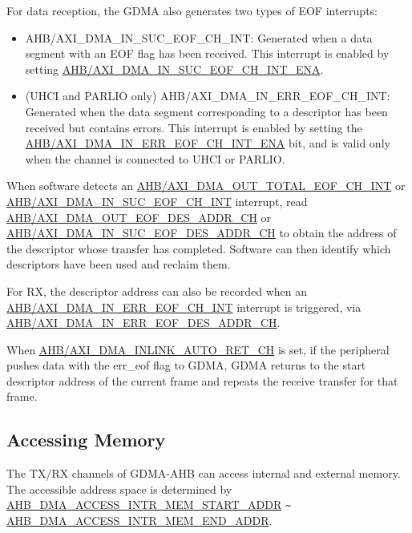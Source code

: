 \documentclass[main\_\_EN.tex]{subfiles}
\begin{document}
For data reception, the GDMA also generates two types of EOF interrupts:
\begin{itemize}
    \item AHB/AXI\_DMA\_IN\_SUC\_EOF\_CH\_INT: Generated when a data segment with an EOF flag has been received. This interrupt is enabled by setting \hyperref[fielddesc:AHBDMAINSUCEOFCHNINTENA]{AHB/AXI\_DMA\_IN\_SUC\_EOF\_CH\_INT\_ENA}.
    \item (UHCI and PARLIO only) AHB/AXI\_DMA\_IN\_ERR\_EOF\_CH\_INT: Generated when the data segment corresponding to a descriptor has been received but contains errors. This interrupt is enabled by setting the \hyperref[fielddesc:AHBDMAINERREOFCHNINTENA]{AHB/AXI\_DMA\_IN\_ERR\_EOF\_CH\_INT\_ENA} bit, and is valid only when the channel is connected to UHCI or PARLIO.
\end{itemize}

When software detects an \hyperref[int:GDMAOUTTOTALEOFINT]{AHB/AXI\_DMA\_OUT\_TOTAL\_EOF\_CH\_INT} or \hyperref[int:GDMAINSUCEOFINT]{AHB/AXI\_DMA\_IN\_SUC\_EOF\_CH\_INT} interrupt, read \hyperref[fielddesc:AHBDMAOUTEOFDESADDRCHN]{AHB/AXI\_DMA\_OUT\_EOF\_DES\_ADDR\_CH} or \hyperref[fielddesc:AHBDMAINSUCEOFDESADDRCHN]{AHB/AXI\_DMA\_IN\_SUC\_EOF\_DES\_ADDR\_CH} to obtain the address of the descriptor whose transfer has completed. Software can then identify which descriptors have been used and reclaim them.

For RX, the descriptor address can also be recorded when an \hyperref[int:GDMAINERREOFINT]{AHB/AXI\_DMA\_IN\_ERR\_EOF\_CH\_INT} interrupt is triggered, via \hyperref[fielddesc:AHBDMAINERREOFDESADDRCHN]{AHB/AXI\_DMA\_IN\_ERR\_EOF\_DES\_ADDR\_CH}.

When \hyperref[fielddesc:AHBDMAINLINKAUTORETCHN]{AHB/AXI\_DMA\_INLINK\_AUTO\_RET\_CH} is set, if the peripheral pushes data with the err\_eof flag to GDMA, GDMA returns to the start descriptor address of the current frame and repeats the receive transfer for that frame.


\subsection{Accessing Memory}\label{sec:dma-access-inter-ram}

The TX/RX channels of GDMA-AHB can access internal and external memory. The accessible address space is determined by \hyperref[fielddesc:AHBDMAACCESSINTRMEMSTARTADDR]{AHB\_DMA\_ACCESS\_INTR\_MEM\_START\_ADDR} \verb+~+ \hyperref[fielddesc:AHBDMAACCESSINTRMEMENDADDR]{AHB\_DMA\_ACCESS\_INTR\_MEM\_END\_ADDR}.
\end{document}
